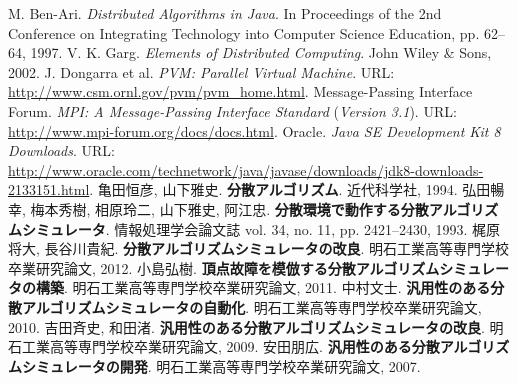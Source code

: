 \begin{thebibliography}{99}
   M. Ben-Ari. {\it Distributed Algorithms in Java}. In Proceedings of the 2nd Conference on Integrating Technology into Computer Science Education, pp. 62--64, 1997.
	 V. K. Garg. {\it Elements of Distributed Computing}. John Wiley \& Sons, 2002.
	 J. Dongarra et al. {\it PVM: Parallel Virtual Machine}. URL: \url{http://www.csm.ornl.gov/pvm/pvm_home.html}.
	 Message-Passing Interface Forum. {\it MPI: A Message-Passing Interface Standard} ({\it Version 3.1}). URL: \url{http://www.mpi-forum.org/docs/docs.html}.
	 Oracle. {\it Java SE Development Kit 8 Downloads}. URL: \url{http://www.oracle.com/technetwork/java/javase/downloads/jdk8-downloads-2133151.html}.
	 亀田恒彦, 山下雅史. {\bf 分散アルゴリズム}. 近代科学社, 1994.
	 弘田暢幸, 梅本秀樹, 相原玲二, 山下雅史, 阿江忠. {\bf 分散環境で動作する分散アルゴリズムシミュレータ}. 情報処理学会論文誌 vol. 34, no. 11, pp. 2421--2430, 1993.
	 梶原将大, 長谷川貴紀. {\bf 分散アルゴリズムシミュレータの改良}. 明石工業高等専門学校卒業研究論文, 2012.
	 小島弘樹. {\bf 頂点故障を模倣する分散アルゴリズムシミュレータの構築}. 明石工業高等専門学校卒業研究論文, 2011.
	 中村文士. {\bf 汎用性のある分散アルゴリズムシミュレータの自動化}. 明石工業高等専門学校卒業研究論文, 2010.
	 吉田斉史, 和田渚. {\bf 汎用性のある分散アルゴリズムシミュレータの改良}. 明石工業高等専門学校卒業研究論文, 2009.
	 安田朋広. {\bf 汎用性のある分散アルゴリズムシミュレータの開発}. 明石工業高等専門学校卒業研究論文, 2007.
\end{thebibliography}
